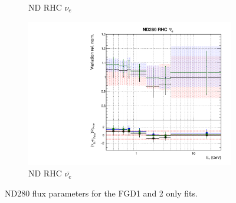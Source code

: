 \begin{figure}
\begin{subfigure}{0.45\textwidth}
  \caption{ND RHC $\nu_{e}$}
\end{subfigure}
\begin{subfigure}{0.45\textwidth}
  \centering
  \includegraphics[width=0.75\linewidth]{figs/fgdfitsflux_7}
  \caption{ND RHC $\bar{\nu_e}$}
\end{subfigure}
\caption{ND280 flux parameters for the FGD1 and 2 only fits.}
\label{fig:fgdfluxND}
\end{figure}

